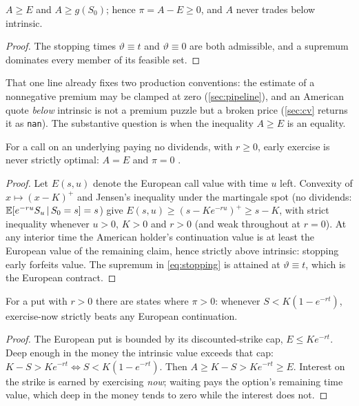\documentclass[11pt]{article}
\begin{document}
\begin{proposition}
\label{prop:dominance}
$A\ge E$ and $A\ge g(S_0)$; hence $\pi=A-E\ge0$, and $A$ never trades
below intrinsic.
\end{proposition}

\begin{proof}
The stopping times $\vartheta\equiv t$ and $\vartheta\equiv0$ are both
admissible, and a supremum dominates every member of its feasible set.
\end{proof}

That one line already fixes two production conventions: the estimate of a
nonnegative premium may be clamped at zero (\cref{sec:pipeline}), and an
American quote \emph{below} intrinsic is not a premium puzzle but a broken
price (\cref{sec:cv} returns it as \texttt{nan}).  The substantive
question is when the inequality $A\ge E$ is an equality.

\begin{theorem}
\label{thm:merton}
For a call on an underlying paying no dividends, with $r\ge0$, early
exercise is never strictly optimal: $A=E$ and $\pi=0$
\cite{Merton1973}.
\end{theorem}

\begin{proof}
Let $E(s,u)$ denote the European call value with time $u$ left.  Convexity
of $x\mapsto(x-K)^+$ and Jensen's inequality under the martingale spot
(no dividends: $\mathbb{E}[e^{-ru}S_u\,|\,S_0=s]=s$) give
$E(s,u)\ge(s-Ke^{-ru})^+\ge s-K$, with strict inequality whenever $u>0$,
$K>0$ and $r>0$ (and weak throughout at $r=0$).  At any interior time the
American holder's continuation value is at least the European value of the
remaining claim, hence strictly above intrinsic: stopping early forfeits
value.  The supremum in \eqref{eq:stopping} is attained at
$\vartheta\equiv t$, which is the European contract.
\end{proof}

\begin{proposition}
\label{prop:put}
For a put with $r>0$ there are states where $\pi>0$: whenever
$S<K(1-e^{-rt})$, exercise-now strictly beats any European continuation.
\end{proposition}

\begin{proof}
The European put is bounded by its discounted-strike cap, $E\le Ke^{-rt}$.
Deep enough in the money the intrinsic value exceeds that cap:
$K-S>Ke^{-rt}\iff S<K(1-e^{-rt})$.  Then
$A\ge K-S>Ke^{-rt}\ge E$.  Interest on the strike is earned by exercising
\emph{now}; waiting pays the option's remaining time value, which deep in
the money tends to zero while the interest does not.
\end{proof}
\end{document}
